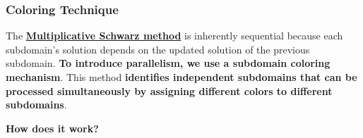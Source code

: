 \subsubsection{Coloring Technique}

The \textbf{\underline{Multiplicative Schwarz method}} is inherently sequential because each subdomain's solution depends on the updated solution of the previous subdomain. \textbf{To introduce parallelism, we use a subdomain coloring mechanism}. This method \textbf{identifies independent subdomains that can be processed simultaneously by assigning different colors to different subdomains}.

\highspace
\begin{flushleft}
    \textcolor{Green3}{ \textbf{How does it work?}}
\end{flushleft}
